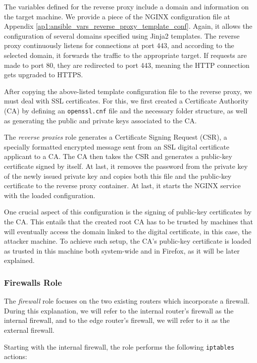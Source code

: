 The variables defined for the reverse proxy include a domain and information on the target machine. We provide a piece of the NGINX configuration file at Appendix \ref{ap1:ansible_vars_reverse_proxy_template_conf}. Again, it allows the configuration of several domains specified using Jinja2 templates. The reverse proxy continuously listens for connections at port 443, and according to the selected domain, it forwards the traffic to the appropriate target. If requests are made to port 80, they are redirected to port 443, meaning the HTTP connection gets upgraded to HTTPS.

After copying the above-listed template configuration file to the reverse proxy, we must deal with SSL certificates. For this, we first created a Certificate Authority (CA) by defining an \texttt{openssl.cnf} file and the necessary folder structure, as well as generating the public and private keys associated to the CA.

The \textit{reverse proxies} role generates a Certificate Signing Request (CSR), a specially formatted encrypted message sent from an SSL digital certificate applicant to a CA. The CA then takes the CSR and generates a public-key certificate signed by itself. At last, it removes the password from the private key of the newly issued private key and copies both this file and the public-key certificate to the reverse proxy container. At last, it starts the NGINX service with the loaded configuration. 

One crucial aspect of this configuration is the signing of public-key certificates by the CA. This entails that the created root CA has to be trusted by machines that will eventually access the domain linked to the digital certificate, in this case, the attacker machine. To achieve such setup, the CA's public-key certificate is loaded as trusted in this machine both system-wide and in Firefox, as it will be later explained.

\subsubsection{Firewalls Role} \label{sec:ansible_firewalls_role}

The \textit{firewall} role focuses on the two existing routers which incorporate a firewall. During this explanation, we will refer to the internal router's firewall as the internal firewall, and to the edge router's firewall, we will refer to it as the external firewall. 

Starting with the internal firewall, the role performs the following \texttt{iptables} actions:

